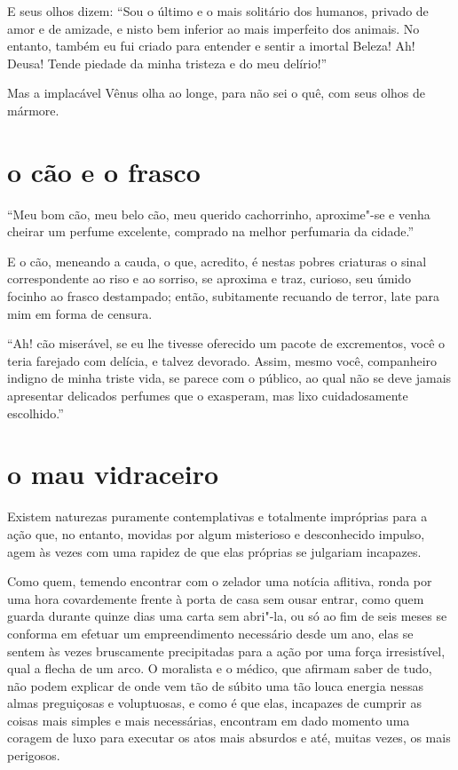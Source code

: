 E seus olhos dizem: ``Sou o último e o mais solitário dos
humanos, privado de amor e de amizade, e nisto bem inferior ao mais
imperfeito dos animais. No entanto, também eu fui criado para entender
e sentir a imortal Beleza! Ah! Deusa! Tende piedade da minha tristeza e
do meu delírio!''

Mas a implacável Vênus olha ao longe, para não sei o quê, com seus olhos
de mármore.

\quebra\section[O cão e o frasco]{o cão e o frasco}

``Meu bom cão, meu belo cão, meu querido cachorrinho,
aproxime"-se e venha cheirar um perfume excelente, comprado na melhor
perfumaria da cidade.''

E o cão, meneando a cauda, o que, acredito, é nestas pobres criaturas o
sinal correspondente ao riso e ao sorriso, se aproxima e traz,
curioso, seu úmido focinho ao frasco destampado; então, subitamente
recuando de terror, late para mim em forma de censura.

``Ah! cão miserável, se eu lhe tivesse oferecido um pacote
de excrementos, você o teria farejado com delícia, e talvez devorado.
Assim, mesmo você, companheiro indigno de minha triste vida, se parece
com o público, ao qual não se deve jamais apresentar delicados perfumes
que o exasperam, mas lixo cuidadosamente escolhido.''

\quebra\section[O mau vidraceiro]{o mau vidraceiro}

Existem naturezas puramente contemplativas e totalmente impróprias para
a ação que, no entanto, movidas por algum misterioso e desconhecido impulso,
agem às vezes com uma rapidez de que elas próprias se julgariam
incapazes.

Como quem, temendo encontrar com o zelador uma notícia aflitiva,
ronda por uma hora covardemente frente à porta de casa sem ousar
entrar, como quem guarda durante quinze dias uma carta sem
abri"-la, ou só ao fim de seis meses se conforma em efetuar um
empreendimento necessário desde um ano, elas se sentem às vezes
bruscamente precipitadas para a ação por uma força irresistível, qual a
flecha de um arco. O moralista e o médico, que afirmam saber de tudo,
não podem explicar de onde vem tão de súbito uma tão louca energia
nessas almas preguiçosas e voluptuosas, e como é que elas, incapazes de
cumprir as coisas mais simples e mais necessárias, encontram em dado
momento uma coragem de luxo para executar os atos mais absurdos e até,
muitas vezes, os mais perigosos.

